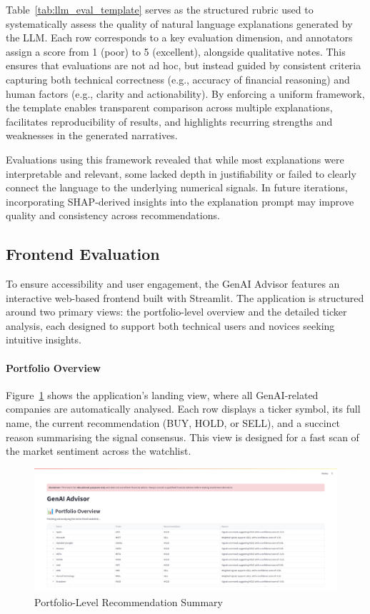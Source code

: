 Table~\ref{tab:llm_eval_template} serves as the structured rubric used to systematically assess the quality of natural language explanations generated by the LLM. Each row corresponds to a key evaluation dimension, and annotators assign a score from 1 (poor) to 5 (excellent), alongside qualitative notes. This ensures that evaluations are not ad hoc, but instead guided by consistent criteria capturing both technical correctness (e.g., accuracy of financial reasoning) and human factors (e.g., clarity and actionability). By enforcing a uniform framework, the template enables transparent comparison across multiple explanations, facilitates reproducibility of results, and highlights recurring strengths and weaknesses in the generated narratives.

Evaluations using this framework revealed that while most explanations were interpretable and relevant, some lacked depth in justifiability or failed to clearly connect the language to the underlying numerical signals. In future iterations, incorporating SHAP-derived insights into the explanation prompt may improve quality and consistency across recommendations.

\subsection{Frontend Evaluation}

To ensure accessibility and user engagement, the GenAI Advisor features an interactive web-based frontend built with Streamlit. The application is structured around two primary views: the portfolio-level overview and the detailed ticker analysis, each designed to support both technical users and novices seeking intuitive insights.

\paragraph{Portfolio Overview}
Figure~\ref{fig:ui_portfolio} shows the application’s landing view, where all GenAI-related companies are automatically analysed. Each row displays a ticker symbol, its full name, the current recommendation (BUY, HOLD, or SELL), and a succinct reason summarising the signal consensus. This view is designed for a fast scan of the market sentiment across the watchlist.

\begin{figure}[h]
\centering
\includegraphics[width=0.9\linewidth]{assets/ui1-portfolio_overview.png}
\caption{Portfolio-Level Recommendation Summary}
\label{fig:ui_portfolio}
\end{figure}

